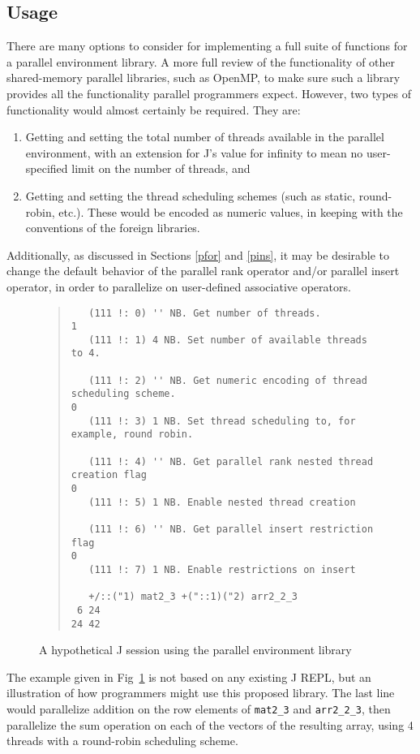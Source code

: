 \subsection{Usage}
There are many options to consider for implementing a full suite of functions for a parallel environment library.
A more full review of the functionality of other shared-memory parallel libraries, such as OpenMP\cite{openmp}, 
to make sure such a library provides all the functionality parallel programmers expect.
However, two types of functionality would almost certainly be required.
They are:

\begin{enumerate}
    \item Getting and setting the total number of threads available in the parallel environment,
        with an extension for J's value for infinity to mean no user-specified limit on the number of threads, and
    \item Getting and setting the thread scheduling schemes (such as static, round-robin, etc.).
        These would be encoded as numeric values, in keeping with the conventions of the foreign libraries.
\end{enumerate}

\noindent Additionally, as discussed in Sections \ref{pfor} and \ref{pins}, it may be desirable to change 
the default behavior of the parallel rank operator and/or parallel insert operator, 
in order to parallelize on user-defined associative operators.

\begin{figure}
\begin{quote}
\begin{singlespacing}
\begin{small}
\begin{verbatim}
   (111 !: 0) '' NB. Get number of threads.
1
   (111 !: 1) 4 NB. Set number of available threads to 4.

   (111 !: 2) '' NB. Get numeric encoding of thread scheduling scheme.
0
   (111 !: 3) 1 NB. Set thread scheduling to, for example, round robin.

   (111 !: 4) '' NB. Get parallel rank nested thread creation flag
0
   (111 !: 5) 1 NB. Enable nested thread creation

   (111 !: 6) '' NB. Get parallel insert restriction flag
0
   (111 !: 7) 1 NB. Enable restrictions on insert

   +/::("1) mat2_3 +("::1)("2) arr2_2_3
 6 24
24 42
\end{verbatim}
\end{small}
\end{singlespacing}
\end{quote}
\label{fig::pfor}
\caption{A hypothetical J session using the parallel environment library}
\end{figure}

The example given in Fig~\ref{fig::pfor} is not based on any existing J REPL, 
but an illustration of how programmers might use this proposed library.
The last line would parallelize addition on the row elements of \texttt{mat2\_3} and \texttt{arr2\_2\_3},
then parallelize the sum operation on each of the vectors of the resulting array, 
using 4 threads with a round-robin scheduling scheme.
